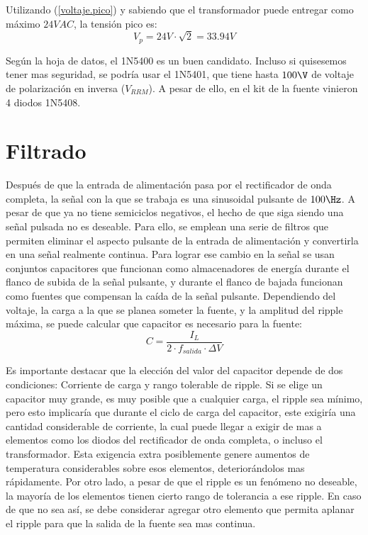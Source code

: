\documentclass[chaptersright]{informeutn}
\begin{document}
          Utilizando (\ref{voltaje.pico}) y sabiendo que el transformador puede entregar como máximo $24VAC$, la
          tensión pico es:
          \begin{equation*}
            V_p = 24V \cdot \sqrt{2} = 33.94V
          \end{equation*}

          Según la hoja de datos, el 1N5400 es un buen candidato. Incluso si quisesemos tener mas seguridad, se podría
          usar el 1N5401, que tiene hasta $100\V$ de voltaje de polarización en inversa ($V_{RRM}$). A pesar de ello,
          en el kit de la fuente vinieron 4 diodos 1N5408.


      \section{Filtrado}
        Después de que la entrada de alimentación pasa por el rectificador de onda completa, la señal con la que se
        trabaja es una sinusoidal pulsante de $100\Hz$. A pesar de que ya no tiene semiciclos negativos, el hecho de que
        siga siendo una señal pulsada no es deseable. Para ello, se emplean una serie de filtros que permiten eliminar
        el aspecto pulsante de la entrada de alimentación y convertirla en una señal realmente continua. Para lograr
        ese cambio en la señal se usan conjuntos capacitores que funcionan como almacenadores de energía durante el
        flanco de subida de la señal pulsante, y durante el flanco de bajada funcionan como fuentes que compensan
        la caída de la señal pulsante. Dependiendo del voltaje, la carga a la que se planea someter la fuente, y la
        amplitud del ripple máxima, se puede calcular que capacitor es necesario para la fuente:
        \begin{equation}
            C = \frac{I_{L}}{2 \cdot f_{salida} \cdot \varDelta V}
            \label{capa.filtrado}
        \end{equation}

        Es importante destacar que la elección del valor del capacitor depende de dos condiciones: Corriente de carga
        y rango tolerable de ripple. Si se elige un capacitor muy grande, es muy posible que a cualquier carga, el
        ripple sea mínimo, pero esto implicaría que durante el ciclo de carga del capacitor, este exigiría una cantidad
        considerable de corriente, la cual puede llegar a exigir de mas a elementos como los diodos del rectificador de
        onda completa, o incluso el transformador. Esta exigencia extra posiblemente genere aumentos de temperatura
        considerables sobre esos elementos, deteriorándolos mas rápidamente. Por otro lado, a pesar de que el ripple
        es un fenómeno no deseable, la mayoría de los elementos tienen cierto rango de tolerancia a ese ripple. En caso
        de que no sea así, se debe considerar agregar otro elemento que permita aplanar el ripple para que la salida de
        la fuente sea mas continua.
\end{document}
